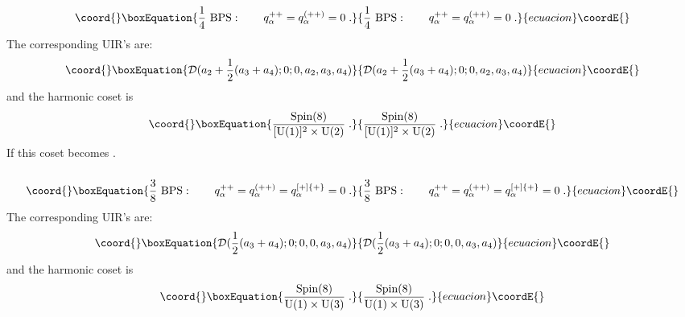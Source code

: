 \documentclass[a4paper,12pt]{article}
\begin{document}
\begin{equation}\coord{}\boxEquation{\label{8.17}
  {1\over 4}\ \mbox{BPS}:\qquad  q_\alpha^{++} =q_\alpha^{(++)} =0\;.  
}{{1\over 4}\ \mbox{BPS}:\qquad  q_\alpha^{++} =q_\alpha^{(++)} =0\;.  
}{ecuacion}\coordE{}\end{equation}
The corresponding UIR's are: 
\begin{equation}\coord{}\boxEquation{\label{8.18}
  {\cal D}(a_2 + {1\over 2}(a_3+a_4);0;0,a_2,a_3,a_4)
}{{\cal D}(a_2 + {1\over 2}(a_3+a_4);0;0,a_2,a_3,a_4)
}{ecuacion}\coordE{}\end{equation}
and the harmonic coset is 
\begin{equation}\coord{}\boxEquation{\label{8.19}
  {\mbox{Spin}(8)\over [\mbox{U}(1)]^2\times \mbox{U}(2)}\;.
}{{\mbox{Spin}(8)\over [\mbox{U}(1)]^2\times \mbox{U}(2)}\;.
}{ecuacion}\coordE{}\end{equation}
If \coordHE{} this coset becomes 
\coordHE{}. 

\subsubsection{} 

\begin{equation}\coord{}\boxEquation{\label{8.20}
  {3\over 8}\ \mbox{BPS}:\qquad  q_\alpha^{++} =q_\alpha^{(++)} = 
q_\alpha^{[+]\{+\}} =0\;.  
}{{3\over 8}\ \mbox{BPS}:\qquad  q_\alpha^{++} =q_\alpha^{(++)} = 
q_\alpha^{[+]\{+\}} =0\;.  
}{ecuacion}\coordE{}\end{equation}
The corresponding UIR's are: 
\begin{equation}\coord{}\boxEquation{\label{8.21}
  {\cal D}({1\over 2}(a_3+a_4);0;0,0,a_3,a_4)
}{{\cal D}({1\over 2}(a_3+a_4);0;0,0,a_3,a_4)
}{ecuacion}\coordE{}\end{equation}
and the harmonic coset is 
\begin{equation}\coord{}\boxEquation{\label{8.22}
  {\mbox{Spin}(8)\over \mbox{U}(1)\times \mbox{U}(3)}\;.
}{{\mbox{Spin}(8)\over \mbox{U}(1)\times \mbox{U}(3)}\;.
}{ecuacion}\coordE{}\end{equation}

\subsubsection{} \label{7.4.4}
\end{document}
